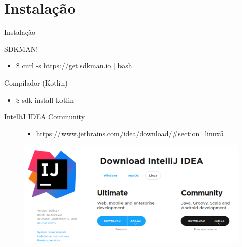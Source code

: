 \documentclass{beamer}
\begin{document}
\section{Instalação}
\begin{frame}{Instalação}


	\begin{block}{SDKMAN!}
		\begin{itemize}
			\item \$ curl -s https://get.sdkman.io | bash
		\end{itemize}
	\end{block}

	\pause

	\begin{block}{Compilador (Kotlin)}
		\begin{itemize}
			 	\item \$ sdk install kotlin
		\end{itemize}
	\end{block}
	
	\pause
	
	\begin{block}{IntelliJ IDEA Community}
		\begin{figure}[!htb]
			\begin{itemize}
				\item https://www.jetbrains.com/idea/download/#section=linux5
			\end{itemize}
			
			\centering
			\includegraphics[scale=.15]{intellij.png}
		\end{figure}
		
		
		
	\end{block}
	

\end{frame}
\end{document}
